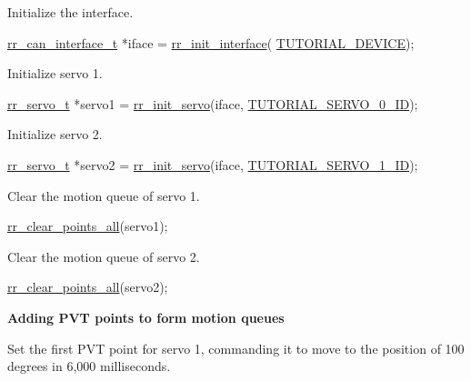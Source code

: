 \begin{DoxyEnumerate}
\item Initialize the interface. 
\begin{DoxyCodeInclude}
    \hyperlink{structrr__can__interface__t}{rr\_can\_interface\_t} *iface = \hyperlink{group___init_ga472a4890dcc7d7a13123c56a06946d91}{rr\_init\_interface}(
      \hyperlink{tutorial_8h_a90947332a0345dc693905e3fc04dbeb2}{TUTORIAL\_DEVICE});
\end{DoxyCodeInclude}

\item Initialize servo 1. 
\begin{DoxyCodeInclude}
    \hyperlink{structrr__servo__t}{rr\_servo\_t} *servo1 = \hyperlink{group___init_ga0adb313a3eeb8a4399431e940a1f3e9e}{rr\_init\_servo}(iface, 
      \hyperlink{tutorial_8h_a9a3d33f25d3a72a8e30c885d238b3b65}{TUTORIAL\_SERVO\_0\_ID});
\end{DoxyCodeInclude}

\item Initialize servo 2. 
\begin{DoxyCodeInclude}
    \hyperlink{structrr__servo__t}{rr\_servo\_t} *servo2 = \hyperlink{group___init_ga0adb313a3eeb8a4399431e940a1f3e9e}{rr\_init\_servo}(iface, 
      \hyperlink{tutorial_8h_a525a6de936d69ba937949199d94ab568}{TUTORIAL\_SERVO\_1\_ID});
\end{DoxyCodeInclude}

\item Clear the motion queue of servo 1. 
\begin{DoxyCodeInclude}
    \hyperlink{group___trajectory_ga19472cd90ae91f9b9f49edf4f52f35a2}{rr\_clear\_points\_all}(servo1);
\end{DoxyCodeInclude}

\item Clear the motion queue of servo 2. 
\begin{DoxyCodeInclude}
    \hyperlink{group___trajectory_ga19472cd90ae91f9b9f49edf4f52f35a2}{rr\_clear\_points\_all}(servo2);
\end{DoxyCodeInclude}
 {\bfseries  Adding P\+VT points to form motion queues}
\item Set the first P\+VT point for servo 1, commanding it to move to the position of 100 degrees in 6,000 milliseconds. 


\end{DoxyEnumerate}
